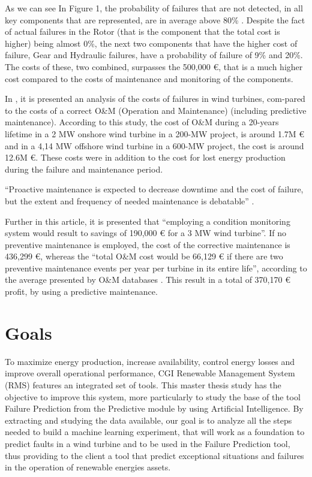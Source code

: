 As we can see In Figure 1, the probability of failures that are not detected, in all key components that are represented, are in average above 80\% . Despite the fact of actual failures in the Rotor (that is the component that the total cost is higher) being almost 0\%, the next two components that have the higher cost of failure, Gear and Hydraulic failures, have a probability of failure of 9\%  and 20\%. The costs of these, two combined, surpasses the 500,000 €, that is a much higher cost compared to the costs of maintenance and monitoring of the components.


In \cite{OLD_53_WIND}, it is presented an analysis of the costs of failures in wind turbines, com-pared to the costs of a correct O&M (Operation and Maintenance) (including predictive maintenance). According to this study, the cost of O\&M during a 20-years lifetime in a 2 MW onshore wind turbine in a 200-MW project, is around 1.7M € and in a 4,14 MW offshore wind turbine in a 600-MW project, the cost is around 12.6M €. These costs were in addition to the cost for lost energy production during the failure and maintenance period.

“Proactive maintenance is expected to decrease downtime and the cost of failure, but the extent and frequency of needed maintenance is debatable” \cite{OLD_53_WIND}.

Further in this article, it is presented that “employing a condition monitoring system would result to savings of 190,000 € for a 3 MW wind turbine”. If no preventive maintenance is employed, the cost of the corrective maintenance is 436,299 €, whereas the “total O\&M cost would be 66,129 € if there are two preventive maintenance events per year per turbine in its entire life”, according to the average presented by O&M databases \cite{OLD_53_WIND}. This result in a total of 370,170 € profit, by using a predictive maintenance.

\section{Goals} 
\label{sub:if_you_use_this_template} 

To maximize energy production, increase availability, control energy losses and improve overall operational performance, CGI Renewable Management System (RMS) \cite{OLD_8} features an integrated set of tools. This master thesis study has the objective to improve this system, more particularly to study the base of the tool Failure Prediction from the Predictive module by using Artificial Intelligence. By extracting and studying the data available, our goal is to analyze all the steps needed to build a machine learning experiment, that will work as a foundation to predict faults in a wind turbine and to be used in the Failure Prediction tool, thus providing to the client a tool that predict exceptional situations and failures in the operation of renewable energies assets.

